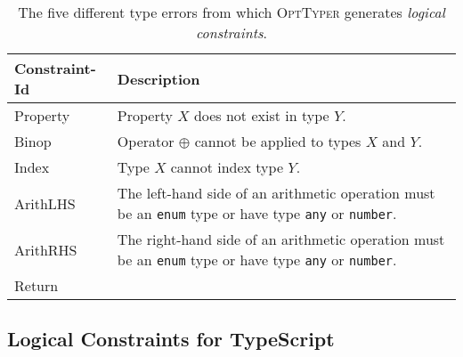 \documentclass[acmsmall, review, anonymous]{acmart}\settopmatter{printfolios=true,printccs=false,printacmref=false}
\newcommand{\projectname}{\textsc{OptTyper}\xspace}
\begin{document}


\begin{table*}[t]
	\centering
	\caption{The five different type errors from which \projectname generates \textit{logical constraints}.}
	\label{tab:constraints}
	\begin{tabularx}{\textwidth}{lX}
		\toprule
		Constraint-Id & Description                                                                                  \\
		\midrule
		Property      & Property $X$ does not exist in type $Y$.                                                     \\
		Binop         & Operator $\oplus$ cannot be applied
		to types $X$ and $Y$.                                                                                        \\
		Index         & Type $X$ cannot index type $Y$.                                                              \\
		ArithLHS      & The left-hand side of an arithmetic operation must be
		an \lstinline+enum+ type or have type \lstinline+any+ or \lstinline+number+.    \\
		ArithRHS      & The right-hand side of an arithmetic operation must be
		an \lstinline+enum+ type or have type \lstinline+any+ or \lstinline+number+. \\
		Return      & \\
		\bottomrule
	\end{tabularx}
\end{table*}

\subsection{Logical Constraints for TypeScript}
\label{ssec:logprodts}
\end{document}
